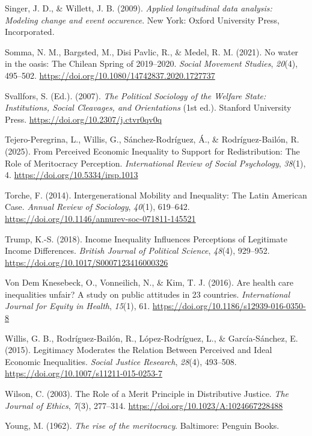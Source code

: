 \documentclass[
  12pt,
]{article}
\newlength{\cslhangindent}
\newenvironment{CSLReferences}[2] %
 {\begin{list}{}{%
  \setlength{\itemindent}{0pt}
  \setlength{\leftmargin}{0pt}
  \setlength{\parsep}{0pt}
  \ifodd #1
   \setlength{\leftmargin}{\cslhangindent}
   \setlength{\itemindent}{-1\cslhangindent}
  \fi
  \setlength{\itemsep}{#2\baselineskip}}}
 {\end{list}}
\begin{document}
\begin{CSLReferences}{1}{0}
Singer, J. D., \& Willett, J. B. (2009). \emph{Applied longitudinal data
analysis: Modeling change and event occurence}. New York: Oxford
University Press, Incorporated.

Somma, N. M., Bargsted, M., Disi Pavlic, R., \& Medel, R. M. (2021). No
water in the oasis: The {Chilean Spring} of 2019--2020. \emph{Social
Movement Studies}, \emph{20}(4), 495--502.
\url{https://doi.org/10.1080/14742837.2020.1727737}

Svallfors, S. (Ed.). (2007). \emph{The {Political Sociology} of the
{Welfare State}: {Institutions}, {Social Cleavages}, and {Orientations}}
(1st ed.). Stanford University Press.
\url{https://doi.org/10.2307/j.ctvr0qv0q}

Tejero-Peregrina, L., Willis, G., Sánchez-Rodríguez, Á., \&
Rodríguez-Bailón, R. (2025). From {Perceived Economic Inequality} to
{Support} for {Redistribution}: {The Role} of {Meritocracy Perception}.
\emph{International Review of Social Psychology}, \emph{38}(1), 4.
\url{https://doi.org/10.5334/irsp.1013}

Torche, F. (2014). Intergenerational {Mobility} and {Inequality}: {The
Latin American Case}. \emph{Annual Review of Sociology}, \emph{40}(1),
619--642. \url{https://doi.org/10.1146/annurev-soc-071811-145521}

Trump, K.-S. (2018). Income {Inequality Influences Perceptions} of
{Legitimate Income Differences}. \emph{British Journal of Political
Science}, \emph{48}(4), 929--952.
\url{https://doi.org/10.1017/S0007123416000326}

Von Dem Knesebeck, O., Vonneilich, N., \& Kim, T. J. (2016). Are health
care inequalities unfair? {A} study on public attitudes in 23 countries.
\emph{International Journal for Equity in Health}, \emph{15}(1), 61.
\url{https://doi.org/10.1186/s12939-016-0350-8}

Willis, G. B., Rodríguez-Bailón, R., López-Rodríguez, L., \&
García-Sánchez, E. (2015). Legitimacy {Moderates} the {Relation Between
Perceived} and {Ideal Economic Inequalities}. \emph{Social Justice
Research}, \emph{28}(4), 493--508.
\url{https://doi.org/10.1007/s11211-015-0253-7}

Wilson, C. (2003). The {Role} of a {Merit Principle} in {Distributive
Justice}. \emph{The Journal of Ethics}, \emph{7}(3), 277--314.
\url{https://doi.org/10.1023/A:1024667228488}

Young, M. (1962). \emph{The rise of the meritocracy}. Baltimore: Penguin
Books.

\end{CSLReferences}
\end{document}
